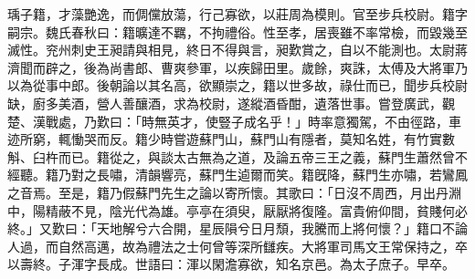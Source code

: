 \begin{pinyinscope}
瑀子籍，才藻艷逸，而倜儻放蕩，行己寡欲，以莊周為模則。官至步兵校尉。籍字嗣宗。魏氏春秋曰：籍曠達不羈，不拘禮俗。性至孝，居喪雖不率常檢，而毀幾至滅性。兖州刺史王昶請與相見，終日不得與言，昶歎賞之，自以不能測也。太尉蔣濟聞而辟之，後為尚書郎、曹爽參軍，以疾歸田里。歲餘，爽誅，太傅及大將軍乃以為從事中郎。後朝論以其名高，欲顯崇之，籍以世多故，祿仕而已，聞步兵校尉缺，廚多美酒，營人善釀酒，求為校尉，遂縱酒昏酣，遺落世事。嘗登廣武，觀楚、漢戰處，乃歎曰：「時無英才，使豎子成名乎！」時率意獨駕，不由徑路，車迹所窮，輒慟哭而反。籍少時嘗遊蘇門山，蘇門山有隱者，莫知名姓，有竹實數斛、臼杵而已。籍從之，與談太古無為之道，及論五帝三王之義，蘇門生蕭然曾不經聽。籍乃對之長嘯，清韻響亮，蘇門生逌爾而笑。籍旣降，蘇門生亦嘯，若鸞鳳之音焉。至是，籍乃假蘇門先生之論以寄所懷。其歌曰：「日沒不周西，月出丹淵中，陽精蔽不見，陰光代為雄。亭亭在須臾，厭厭將復隆。富貴俯仰間，貧賤何必終。」又歎曰：「天地解兮六合開，星辰隕兮日月頹，我騰而上將何懷？」籍口不論人過，而自然高邁，故為禮法之士何曾等深所讎疾。大將軍司馬文王常保持之，卒以壽終。子渾字長成。世語曰：渾以閑澹寡欲，知名京邑。為太子庶子。早卒。


\end{pinyinscope}
